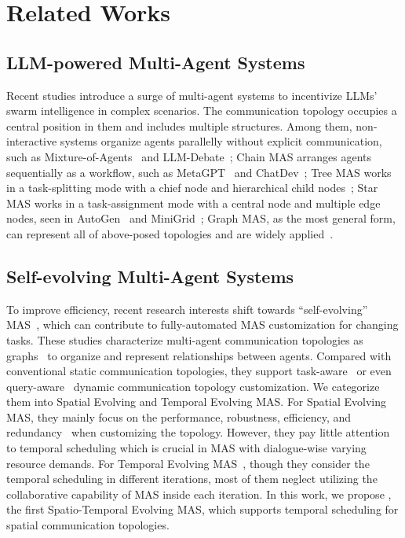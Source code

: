 \section{Related Works}
\subsection{LLM-powered Multi-Agent Systems} 

Recent studies introduce a surge of multi-agent systems to incentivize LLMs' swarm intelligence in complex scenarios. The communication topology occupies a central position in them and includes multiple structures. Among them, non-interactive systems organize agents parallelly without explicit communication, such as Mixture-of-Agents~\citep{wangmixture} and LLM-Debate~\citep{estornell2024multi}; Chain MAS arranges agents sequentially as a workflow, such as MetaGPT~\citep{hong2023metagpt} and ChatDev~\citep{qian2024chatdev}; Tree MAS works in a task-splitting mode with a chief node and hierarchical child nodes~\citep{yao2023tree}; Star MAS works in a task-assignment mode with a central node and multiple edge nodes, seen in AutoGen~\citep{wu2024autogen} and MiniGrid~\citep{zhou2024large}; Graph MAS, as the most general form, can represent all of above-posed topologies and are widely applied~\citep{langgraph,zhuge2024gptswarm,wu2024autogen}.


\subsection{Self-evolving Multi-Agent Systems} 
To improve efficiency, recent research interests shift towards ``self-evolving'' MAS~\citep{wang2025evoagentx,fang2025comprehensive}, which can contribute to fully-automated MAS customization for changing tasks. These studies characterize multi-agent communication topologies as graphs~\cite{liu2023dynamic,zhuge2024gptswarm,GDesigner} to organize and represent relationships between agents. Compared with conventional static communication topologies, they support task-aware~\citep{liu2023dynamic,zhuge2024gptswarm} or even query-aware~\citep{GDesigner,li2025assemble,zhang2025safesieve} dynamic communication topology customization. We categorize them into Spatial Evolving and Temporal Evolving MAS. For Spatial Evolving MAS, they mainly focus on the performance, robustness, efficiency, and redundancy~\citep{zhang2025safesieve} when customizing the topology. However, they pay little attention to temporal scheduling which is crucial in MAS with dialogue-wise varying resource demands. For Temporal Evolving MAS~\citep{zhangaflow,niu2025flow,lee2025confidence}, though they consider the temporal scheduling in different iterations, most of them neglect utilizing the collaborative capability of MAS inside each iteration. In this work, we propose \ourmethod, the first Spatio-Temporal Evolving MAS, which supports temporal scheduling for spatial communication topologies.